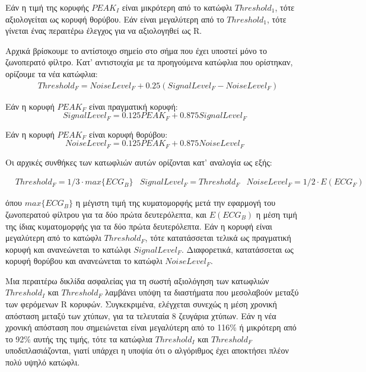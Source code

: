 Εάν η τιμή της κορυφής $PEAK_I$ είναι μικρότερη από το κατώφλι $Threshold_1$, τότε αξιολογείται ως κορυφή θορύβου. Εάν είναι μεγαλύτερη από το $Threshold_1$, τότε γίνεται ένας περαιτέρω έλεγχος για να αξιολογηθεί ως R.

Αρχικά βρίσκουμε το αντίστοιχο σημείο στο σήμα που έχει υποστεί μόνο το ζωνοπερατό φίλτρο. Κατ' αντιστοιχία με τα προηγούμενα κατώφλια που ορίστηκαν, ορίζουμε τα νέα κατώφλια:
\begin{equation}
\label{eq:thresholdf}
\begin{array}{l}
    & Threshold_F = NoiseLevel_F + 0.25(SignalLevel_F - NoiseLevel_F)
\end{array}
\end{equation}

Εάν η κορυφή $PEAK_F$ είναι πραγματική κορυφή:
\begin{equation}
\label{eq:thresholdf_renewal}
   SignalLevel_F = 0.125PEAK_F + 0.875SignalLevel_F 
\end{equation}

Εάν η κορυφή $PEAK_F$ είναι κορυφή θορύβου:
\begin{equation}
\label{eq:thresholdf_renewal}
   NoiseLevel_F = 0.125PEAK_F + 0.875NoiseLevel_F 
\end{equation}

Οι αρχικές συνθήκες των κατωφλιών αυτών ορίζονται κατ' αναλογία ως εξής:

\begin{equation}
\label{eq:thresholdf_starting_conditions}
\begin{array}{l}
    & Threshold_F = 1/3\cdot max\{ECG_B\}
    & SignalLevel_F = Threshold_F
    & NoiseLevel_F = 1/2 \cdot E(ECG_F)
\end{array}
\end{equation}

όπου $max\{ECG_B\}$ η μέγιστη τιμή της κυματομορφής μετά την εφαρμογή του ζωνοπερατού φίλτρου για τα δύο πρώτα δευτερόλεπτα, και $E(ECG_B)$ η μέση τιμή της ίδιας κυματομορφής για τα δύο πρώτα δευτερόλεπτα. Εάν η κορυφή είναι μεγαλύτερη από το κατώφλι $Threshold_F$, τότε κατατάσσεται τελικά ως πραγματική κορυφή και ανανεώνεται το κατώλφι $SignalLevel_F$. Διαφορετικά, κατατάσσεται ως κορυφή θορύβου και ανανεώνεται το κατώφλι $NoiseLevel_F$.

Μια περαιτέρω δικλίδα ασφαλείας για τη σωστή αξιολόγηση των κατωφλιών $Threshold_I$ και $Threshold_F$ λαμβάνει υπόψη τα διαστήματα που μεσολαβούν μεταξύ των φερόμενων R κορυφών. Συγκεκριμένα, ελέγχεται συνεχώς η μέση χρονική απόσταση μεταξύ των χτύπων, για τα τελευταία 8 ζευγάρια χτύπων. Εάν η νέα χρονική απόσταση που σημειώνεται είναι μεγαλύτερη από το 116\% ή μικρότερη από το 92\% αυτής της τιμής, τότε τα κατώφλια $Threshold_I$ και $Threshold_F$ υποδιπλασιάζονται, γιατί υπάρχει η υποψία ότι ο αλγόριθμος έχει αποκτήσει πλέον πολύ υψηλό κατώφλι.

